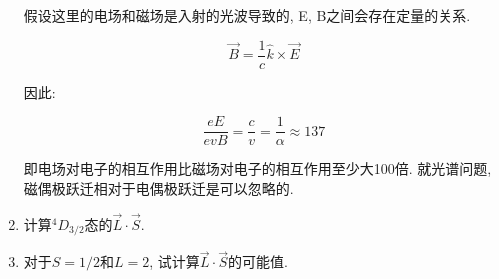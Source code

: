 \begin{enumerate}
假设这里的电场和磁场是入射的光波导致的, E, B之间会存在定量的关系.

\begin{equation*}
    \vec B = \frac{1}{c}\hat k \times \vec E
\end{equation*}

因此:

\begin{equation*}
    \frac{e E}{ e v B} = \frac{c}{v} =\frac{1}{\alpha} \approx 137
\end{equation*}

即电场对电子的相互作用比磁场对电子的相互作用至少大100倍. 就光谱问题,
磁偶极跃迁相对于电偶极跃迁是可以忽略的.


  \item 计算${}^4D_{3/2}$态的$\vec L \cdot \vec S$.
  \item 对于$S=1/2$和$L=2$, 试计算$\vec L \cdot \vec S$的可能值.

\end{enumerate}
